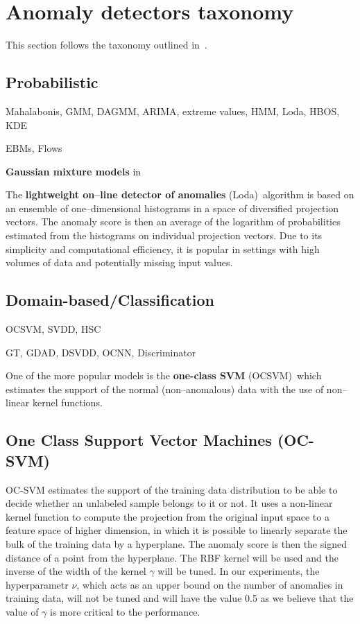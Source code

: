 \section{Anomaly detectors taxonomy}

This section follows the taxonomy outlined in~\cite{pimentel2014review, ruff2020unifying}.


\subsection{Probabilistic}

Mahalabonis, GMM, DAGMM, ARIMA, extreme values, HMM, Loda, HBOS, KDE

EBMs, Flows

\textbf{Gaussian mixture models} in\,\cite{mahadevan2010anomaly}


The \textbf{lightweight on--line detector of anomalies} (Loda)\,\cite{pevny2016loda}
algorithm is based on an ensemble of one--dimensional histograms
in a space of diversified projection vectors. The anomaly score is
then an average of the logarithm of probabilities estimated from the
histograms on individual projection vectors. Due to its simplicity
and computational efficiency, it is popular in settings with high
volumes of data and potentially missing input values.


\subsection{Domain-based/Classification}

OCSVM, SVDD, HSC

GT, GDAD, DSVDD, OCNN, Discriminator

One of the more popular models is the \textbf{one-class SVM} (OCSVM)\,\cite{scholkopf2001estimating}
which estimates the support of the normal (non--anomalous) data with
the use of non--linear kernel functions.

\subsection{One Class Support Vector Machines (OC-SVM)}
OC-SVM \cite{scholkopf2001estimating} estimates the support of the training data distribution to be able to decide whether an unlabeled sample belongs to it or not. It uses a non-linear kernel function to compute the projection from the original input space to a feature space of higher dimension, in which it is possible to linearly separate the bulk of the training data by a hyperplane. The anomaly score is then the signed distance of a point from the hyperplane.  The RBF kernel will be used and the inverse of the width of the kernel $\gamma$ will be tuned. In our experiments, the hyperparametr $\nu$, which acts as an upper bound on the number of anomalies in training data, will not be tuned and will have the value 0.5 as we believe that the value of $\gamma$ is more critical to the performance.


